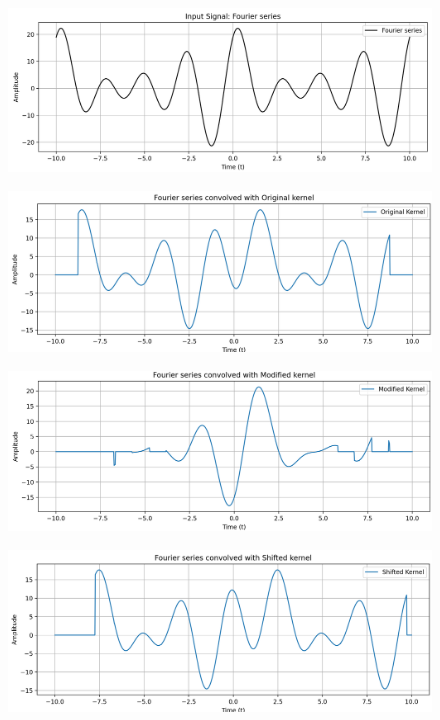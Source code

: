\documentclass{article}
\begin{document}
\begin{figure}[H]
    \centering
    \includegraphics[width=\linewidth]{figs/fourierbreak.png}
\end{figure}
\begin{figure}[H]
    \centering
    \includegraphics[width=\linewidth]{figs/fourierconv.png}
\end{figure}
\begin{figure}[H]
    \centering
    \includegraphics[width=\linewidth]{figs/modifiedfourier.png}
\end{figure}
\begin{figure}[H]
    \centering
    \includegraphics[width=\linewidth]{figs/shiftedfourier.png}
\end{figure}
\end{document}
